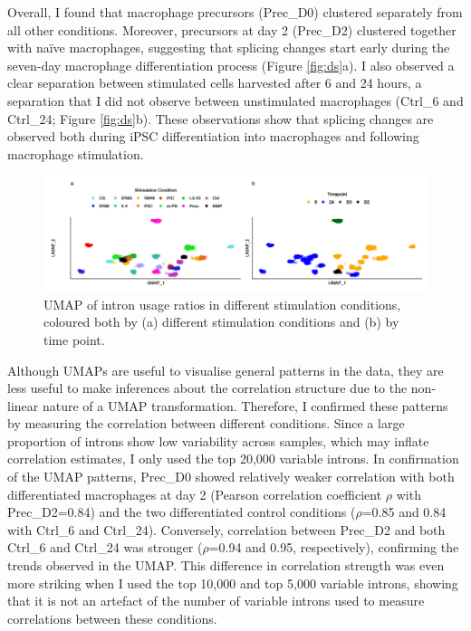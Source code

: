 Overall, I found that macrophage precursors (Prec\_D0) clustered separately from all other conditions. Moreover, precursors at day 2 (Prec\_D2) clustered together with naïve macrophages, suggesting that splicing changes start early during the seven-day macrophage differentiation process (Figure \ref{fig:ds}a). I also observed a clear separation between stimulated cells harvested after 6 and 24 hours, a separation that I did not observe between unstimulated macrophages (Ctrl\_6 and Ctrl\_24; Figure \ref{fig:ds}b). These observations show that splicing changes are observed both during iPSC differentiation into macrophages and following macrophage stimulation. \\



\begin{figure}[H]
  \centering
  \includegraphics[width=\textwidth]{Vector/umap.png}
  \caption[UMAP of intron usage ratios in different stimulation conditions and timepoints]{ UMAP of intron usage ratios in different stimulation conditions, coloured both by (a) different stimulation conditions and (b) by time point.}
  \label{fig:umap}   
\end{figure}
Although UMAPs are useful to visualise general patterns in the data, they are less useful to make inferences about the correlation structure due to the non-linear nature of a UMAP transformation. Therefore, I confirmed these patterns by measuring the correlation between different conditions. Since a large proportion of introns show low variability across samples, which may inflate correlation estimates, I only used the top 20,000 variable introns. In confirmation of the UMAP patterns, Prec\_D0 showed relatively weaker correlation with both differentiated macrophages at day 2 (Pearson correlation coefficient $\rho$ with Prec\_D2=0.84) and the two differentiated control conditions ($\rho$=0.85 and 0.84 with Ctrl\_6 and Ctrl\_24). Conversely, correlation between Prec\_D2 and both Ctrl\_6 and Ctrl\_24 was stronger ($\rho$=0.94 and 0.95, respectively), confirming the trends observed in the UMAP. This difference in correlation strength was even more striking when I used the top 10,000 and top 5,000 variable introns, showing that it is not an artefact of the number of variable introns used to measure correlations between these conditions.\\

